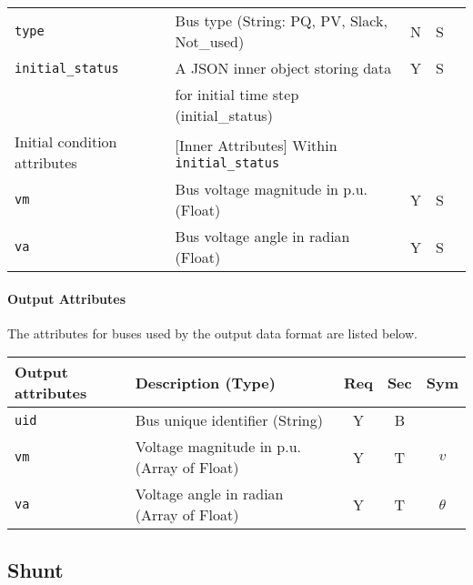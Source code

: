 \documentclass{article}
\begin{document}
\begin{center}
\begin{tabular}{ l | l | c | c | c |}
  {\tt type} & Bus type (String: PQ, PV, Slack, Not\_used) & N & S &\\
  {\tt initial\_status} & A JSON inner object storing data  & Y & S &  \\
       & for initial time step (initial\_status) &  &  &  \\
  \hline
  Initial condition attributes & [Inner Attributes] Within {\tt initial\_status} & & & \\
  \hline
  {\tt vm}   & Bus voltage magnitude in p.u. (Float) & Y & S & \\
  {\tt va}   & Bus voltage angle     in radian (Float) & Y & S & \\
  \hline
\end{tabular}
\end{center}\textbf{}
\paragraph{Output Attributes} The attributes for buses used by the output data format are listed below.

\begin{center}
\small
\begin{tabular}{ l | l | c | c | c |}
Output attributes & Description (Type) & Req & Sec & Sym\\
\hline
  {\tt uid} & Bus unique identifier (String) & Y & B & \\
  
  {\tt vm} & Voltage magnitude in p.u. (Array of Float)  & Y & T & $v$ \\
  {\tt va} & Voltage angle in radian (Array of Float)  & Y & T & $\theta$\\
\hline
\end{tabular}
\end{center}



\subsection{Shunt}
\label{nom:shunt}
\end{document}
